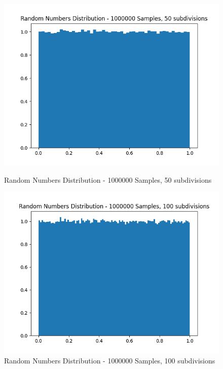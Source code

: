 \documentclass[11pt]{article}
\begin{document}
\begin{figure}[H]
    \centering
    \begin{minipage}{0.48\textwidth}
        \centering
        \includegraphics[width=\textwidth]{Random Numbers Distribution - 1000000 Samples, 50 subdivisions.png}
        \caption{Random Numbers Distribution - 1000000 Samples, 50 subdivisions}
        \label{fig:7}
    \end{minipage}\hfill
    \begin{minipage}{0.48\textwidth}
        \centering
        \includegraphics[width=\textwidth]{Random Numbers Distribution - 1000000 Samples, 100 subdivisions.png}
        \caption{Random Numbers Distribution - 1000000 Samples, 100 subdivisions}
        \label{fig:8}
    \end{minipage}
\end{figure}
\end{document}
